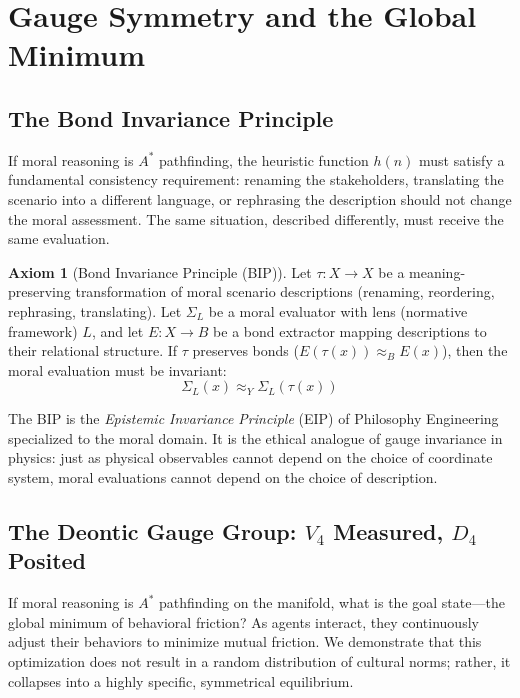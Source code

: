 \documentclass[12pt,letterpaper]{article}
\theoremstyle{definition}
\newtheorem{axiom}{Axiom}
\theoremstyle{remark}
\begin{document}
\section{Gauge Symmetry and the Global Minimum}
\label{sec:gauge}

\subsection{The Bond Invariance Principle}

If moral reasoning is $A^*$ pathfinding, the heuristic function $h(n)$ must satisfy a fundamental consistency requirement: renaming the stakeholders, translating the scenario into a different language, or rephrasing the description should not change the moral assessment. The same situation, described differently, must receive the same evaluation.

\begin{axiom}[Bond Invariance Principle (BIP)]
\label{axiom:bip}
Let $\tau: X \to X$ be a meaning-preserving transformation of moral scenario descriptions (renaming, reordering, rephrasing, translating). Let $\Sigma_L$ be a moral evaluator with lens (normative framework) $L$, and let $E: X \to B$ be a bond extractor mapping descriptions to their relational structure. If $\tau$ preserves bonds ($E(\tau(x)) \approx_B E(x)$), then the moral evaluation must be invariant:
\begin{equation}
\Sigma_L(x) \approx_Y \Sigma_L(\tau(x))
\label{eq:bip}
\end{equation}
\end{axiom}

The BIP is the \emph{Epistemic Invariance Principle} (EIP) of Philosophy Engineering \cite{bond2025eip} specialized to the moral domain. It is the ethical analogue of gauge invariance in physics: just as physical observables cannot depend on the choice of coordinate system, moral evaluations cannot depend on the choice of description.

\subsection{The Deontic Gauge Group: \texorpdfstring{$V_4$}{V4} Measured, \texorpdfstring{$D_4$}{D4} Posited}

If moral reasoning is $A^*$ pathfinding on the manifold, what is the goal state---the global minimum of behavioral friction? As agents interact, they continuously adjust their behaviors to minimize mutual friction. We demonstrate that this optimization does not result in a random distribution of cultural norms; rather, it collapses into a highly specific, symmetrical equilibrium.
\end{document}
